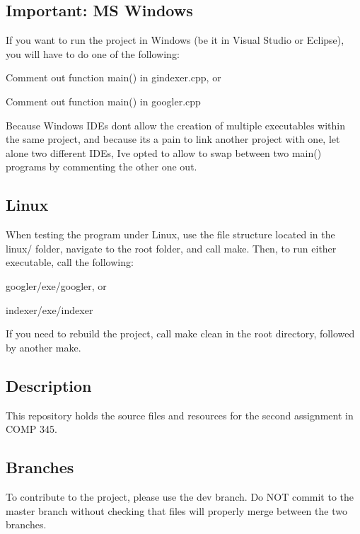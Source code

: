\subsection*{Important\+: MS Windows}

If you want to run the project in Windows (be it in Visual Studio or Eclipse), you will have to do one of the following\+:


\begin{DoxyItemize}
\item Comment out function {\ttfamily main()} in {\ttfamily gindexer.\+cpp}, or
\item Comment out function {\ttfamily main()} in {\ttfamily googler.\+cpp}
\end{DoxyItemize}

Because Windows I\+D\+Es don\textquotesingle{}t allow the creation of multiple executables within the same project, and because it\textquotesingle{}s a pain to link another project with one, let alone two different I\+D\+Es, I\textquotesingle{}ve opted to allow to swap between two {\ttfamily main()} programs by commenting the other one out.

\subsection*{Linux}

When testing the program under Linux, use the file structure located in the {\ttfamily linux/} folder, navigate to the root folder, and call {\ttfamily make}. Then, to run either executable, call the following\+:


\begin{DoxyItemize}
\item {\ttfamily googler/exe/googler}, or
\item {\ttfamily indexer/exe/indexer}
\end{DoxyItemize}

If you need to rebuild the project, call {\ttfamily make clean} in the root directory, followed by another {\ttfamily make}.

\subsection*{Description}

This repository holds the source files and resources for the second assignment in C\+O\+MP 345.

\subsection*{Branches}

To contribute to the project, please use the {\ttfamily dev} branch. Do N\+OT commit to the {\ttfamily master} branch without checking that files will properly merge between the two branches. 